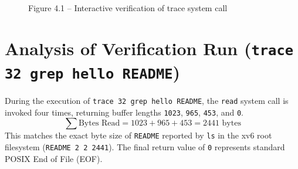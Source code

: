 \documentclass[12pt,a4paper]{report}
\numberwithin{equation}{chapter}
\numberwithin{figure}{chapter}
\numberwithin{table}{chapter}
\begin{document}
\begin{figure}[H]
\centering
\caption{Figure 4.1 -- Interactive verification of trace system call}
\end{figure}

\section{Analysis of Verification Run (\texttt{trace 32 grep hello README})}
During the execution of \texttt{trace 32 grep hello README}, the \texttt{read} system call is invoked four times, returning buffer lengths \texttt{1023}, \texttt{965}, \texttt{453}, and \texttt{0}.
\begin{equation}
\sum \text{Bytes Read} = 1023 + 965 + 453 = 2441 \text{ bytes}
\end{equation}
This matches the exact byte size of \texttt{README} reported by \texttt{ls} in the xv6 root filesystem (\texttt{README 2 2 2441}). The final return value of \texttt{0} represents standard POSIX End of File (EOF).
\end{document}
